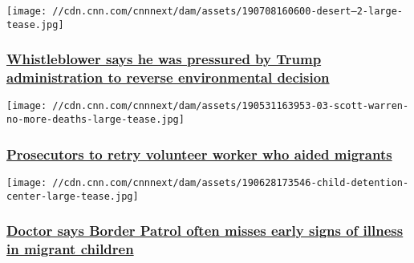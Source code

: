 \href{/2019/07/08/politics/interior-department-arizona-development-bernhardt/index.html}{}

\texttt{[image: //cdn.cnn.com/cnnnext/dam/assets/190708160600-desert--2-large-tease.jpg]}

\hypertarget{whistleblower-says-he-was-pressured-by-trump-administration-to-reverse-environmental-decision}{%
\subsubsection{\texorpdfstring{\href{/2019/07/08/politics/interior-department-arizona-development-bernhardt/index.html}{Whistleblower
says he was pressured by Trump administration to reverse environmental
decision}}{Whistleblower says he was pressured by Trump administration to reverse environmental decision}}\label{whistleblower-says-he-was-pressured-by-trump-administration-to-reverse-environmental-decision}}

\href{/2019/07/02/us/scott-warren-migrant-humanitarian-prosecution-invs/index.html}{}

\texttt{[image: //cdn.cnn.com/cnnnext/dam/assets/190531163953-03-scott-warren-no-more-deaths-large-tease.jpg]}

\hypertarget{prosecutors-to-retry-volunteer-worker-who-aided-migrants}{%
\subsubsection{\texorpdfstring{\href{/2019/07/02/us/scott-warren-migrant-humanitarian-prosecution-invs/index.html}{Prosecutors
to retry volunteer worker who aided
migrants}}{Prosecutors to retry volunteer worker who aided migrants}}\label{prosecutors-to-retry-volunteer-worker-who-aided-migrants}}

\href{/2019/07/01/us/migrant-children-hospitalized-doctor-border-invs/index.html}{}

\texttt{[image: //cdn.cnn.com/cnnnext/dam/assets/190628173546-child-detention-center-large-tease.jpg]}

\hypertarget{doctor-says-border-patrol-often-misses-early-signs-of-illness-in-migrant-children}{%
\subsubsection{\texorpdfstring{\href{/2019/07/01/us/migrant-children-hospitalized-doctor-border-invs/index.html}{Doctor
says Border Patrol often misses early signs of illness in migrant
children}}{Doctor says Border Patrol often misses early signs of illness in migrant children}}\label{doctor-says-border-patrol-often-misses-early-signs-of-illness-in-migrant-children}}


